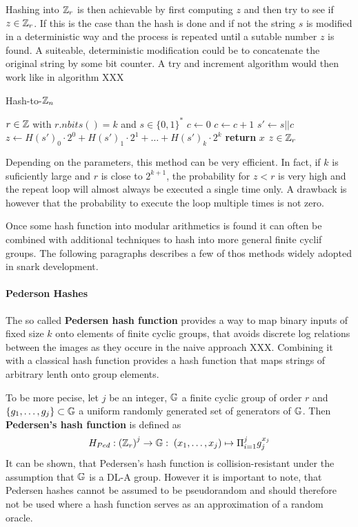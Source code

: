 Hashing into $\mathbb{Z}_r$ is then achievable by first computing $z$ and then try to see if $z\in\mathbb{Z}_r$. If this is the case than the hash is done and if not the string $s$ is modified in a deterministic way and the process is repeated until a sutable number $z$ is found. A suiteable, deterministic modification could be to concatenate the original string by some bit counter. A try and increment algorithm would then work like in algorithm XXX
\begin{algorithm}\caption{Hash-to-$\mathbb{Z}_n$}
\label{alg_projective_group_law}
\begin{algorithmic}[0]
\Require $r \in \mathbb{Z}$ with $r.nbits()=k$ and $s\in\{0,1\}^*$
\State $c \gets 0$
\Repeat
\State $c\gets c+1$
\State $s' \gets s||c$
\State $z \gets H(s')_0\cdot 2^0 + H(s')_1\cdot 2^1 + \ldots + H(s')_{k}\cdot 2^{k}$
\State \textbf{return} $x$
\EndProcedure
\Ensure $ z\in \mathbb{Z}_r$
\end{algorithmic}
\end{algorithm}

Depending on the parameters, this method can be very efficient. In fact, if $k$ is suficiently large and $r$ is close to $2^{k+1}$, the probability for $z<r$ is very high and the repeat loop will almost always be executed a single time only. A drawback is however that the probability to execute the loop multiple times is not zero. 

Once some hash function into modular arithmetics is found it can often be combined with additional techniques to hash into more general finite cyclif groups. The following paragraphs describes a few of thos methods widely adopted in snark development.
\paragraph{Pederson Hashes}
The so called \textbf{Pedersen hash function} provides a way to map binary inputs of fixed size $k$ onto elements of finite cyclic groups, that avoids discrete log relations between the images as they occure in the naive approach XXX. Combining it with a classical hash function provides a hash function that maps strings of arbitrary lenth onto group elements. 

To be more pecise, let $j$ be an integer, $\mathbb{G}$ a finite cyclic group of order $r$ and $\{g_1, \ldots, g_j\} \subset \mathbb{G}$ a uniform randomly generated set of generators of $\mathbb{G}$. Then \textbf{Pedersen’s hash function} is defined as
\begin{equation}
H_{Ped} : \left(\mathbb{Z}_r\right)^j \to \mathbb{G}:\; (x_1,\ldots,x_j)\mapsto \Pi_{i=1}^j g_j^{x_j}
\end{equation}
It can be shown, that Pedersen’s  hash  function  is  collision-resistant under the assumption that $\mathbb{G}$ is a DL-A group. However it is important to note, that Pedersen hashes cannot be assumed to be pseudorandom and should therefore not be used where a hash function serves as an approximation of a random oracle.

